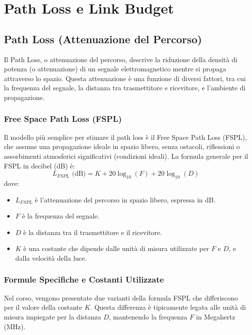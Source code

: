 \section{Path Loss e Link Budget}


\subsection{Path Loss (Attenuazione del Percorso)}

Il Path Loss, o attenuazione del percorso, descrive la riduzione della densità di potenza (o attenuazione) di un segnale elettromagnetico mentre si propaga attraverso lo spazio. Questa attenuazione è una funzione di diversi fattori, tra cui la frequenza del segnale, la distanza tra trasmettitore e ricevitore, e l'ambiente di propagazione.

\subsubsection{Free Space Path Loss (FSPL)}

Il modello più semplice per stimare il path loss è il Free Space Path Loss (FSPL), che assume una propagazione ideale in spazio libero, senza ostacoli, riflessioni o assorbimenti atmosferici significativi (condizioni ideali).
La formula generale per il FSPL in decibel (dB) è:
\begin{equation}
L_{FSPL} \text{ (dB)} = K + 20 \log_{10}(F) + 20 \log_{10}(D)
\label{eq:fspl_general}
\end{equation}
dove:
\begin{itemize}
    \item $L_{FSPL}$ è l'attenuazione del percorso in spazio libero, espressa in dB.
    \item $F$ è la frequenza del segnale.
    \item $D$ è la distanza tra il trasmettitore e il ricevitore.
    \item $K$ è una costante che dipende dalle unità di misura utilizzate per $F$ e $D$, e dalla velocità della luce.
\end{itemize}

\subsubsection{Formule Specifiche e Costanti Utilizzate}

Nel corso, vengono presentate due varianti della formula FSPL che differiscono per il valore della costante $K$. Questa differenza è tipicamente legata alle unità di misura impiegate per la distanza $D$, mantenendo la frequenza $F$ in Megahertz (MHz).

